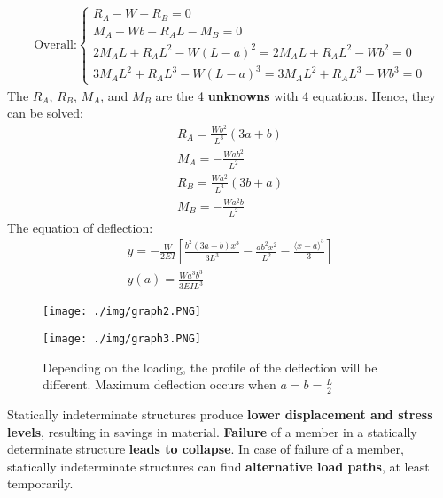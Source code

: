 \begin{gather}
  \text{Overall:}
  \begin{cases}
    R_A-W+R_B = 0                                 \\
    M_A-Wb+R_AL-M_B = 0                           \\
    2M_AL+R_AL^2-W(L-a)^2 = 2M_AL+R_AL^2-Wb^2 = 0 \\
    3M_AL^2+R_AL^3-W(L-a)^3 = 3M_AL^2+R_AL^3-Wb^3 = 0
  \end{cases}
\end{gather}
The $R_A$, $R_B$, $M_A$, and $M_B$ are the 4 \textbf{unknowns} with 4 equations. Hence, they can be solved:
\begin{gather}
  R_A = \frac{Wb^2}{L^3}(3a+b) \\
  M_A = -\frac{Wab^2}{L^2} \\
  R_B = \frac{Wa^2}{L^3}(3b+a) \\
  M_B = -\frac{Wa^2b}{L^2}
\end{gather}
The equation of deflection:
\begin{gather}
  y = -\frac{W}{2EI}\left[\frac{b^2(3a+b)x^3}{3L^3}-\frac{ab^2x^2}{L^2}-\frac{\langle x-a \rangle^3}{3}\right] \\
  y(a) = \frac{Wa^3b^3}{3EIL^3}
\end{gather}
\begin{figure}[H]
  \centering
  \texttt{[image: ./img/graph2.PNG]}
\end{figure}
\begin{figure}[H]
  \centering
  \texttt{[image: ./img/graph3.PNG]}
  \caption{Depending on the loading, the profile of the deflection will be different. Maximum deflection occurs when $a=b=\frac{L}{2}$}
\end{figure}
Statically indeterminate structures produce \textbf{lower displacement and stress levels}, resulting in savings in material.
\textbf{Failure} of a member in a statically determinate structure \textbf{leads to collapse}. In case of failure of a member, statically indeterminate structures can find \textbf{alternative load paths}, at least temporarily.